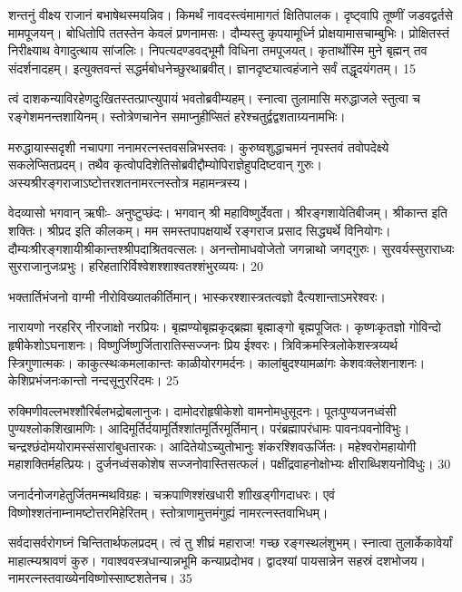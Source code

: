   शन्तनुं वीक्ष्य राजानं बभाषेथस्मयन्निव।
 किमर्थं नावदस्त्वंमामागतं क्षितिपालक।
 दृष्ट्वापि तूष्णीं जडवद्वर्तसे मामपूजयन्।
 बोधितोपि ततस्तेन केवलं प्रणनामसः।
 दौम्यस्तु कृपयामूर्ध्नि प्रोक्षयामासचाम्बुभिः।
 प्रोक्षितस्तं निरीक्ष्याथ वेगादुत्थाय सांजलिः।
 निपत्यदण्डवद्भूमौ विधिना तमपूजयत्।
 कृतार्थोस्मि मुने बृह्मन् तव संदर्शनादहम्।
 इत्युक्तवन्तं सद्धर्मबोधनेच्छुरथाब्रवीत्।
 ज्ञानदृष्ट्यात्वहंजाने सर्वं तद्धृदयंगतम्।
 15

  त्वं दाशकन्याविरहेणदुःखितस्तत्प्राप्त्युपायं भवतोब्रवीम्यहम्।
 स्नात्वा तुलामासि मरुद्धाजले स्तुत्वा च रङ्गेशमनन्तशायिनम्।
 स्तोत्रेणचानेन समाप्नुहीप्सितं हरेश्चतुर्द्वद्वशताग्र्यनामभिः।
 
मरुद्धायास्सदृशी नचापगा ननामरत्नस्तवसन्निभस्तवः।
 कुरुष्वशुद्धाचमनं नृपस्तवं तवोपदेक्ष्ये सकलेप्सितप्रदम्।
 तथैव कृत्वोपदिशेतिसोब्रवीद्दौम्योपिराज्ञेहुपदिष्टवान्
गुरुः।
 अस्यश्रीरङ्गराजाऽष्टोत्तरशतनामरत्नस्तोत्र
महामन्त्रस्य।

वेदव्यासो भगवान् ऋषीः- अनुष्टुप्छंदः।
 भगवान् श्री महाविष्णुर्देवता।
 श्रीरङ्गशायेतिबीजम्।
 श्रीकान्त इति शक्तिः।
 श्रीप्रद इति कीलकम्।
 मम समस्तपापक्षयार्थे रङ्गराज प्रसाद सिद्ध्यर्थे विनियोगः।
 दौम्यःश्रीरङ्गशायीश्रीकान्तश्श्रीपदाश्रितवत्सलः।
 अनन्तोमाधवोजेतो जगन्नाथो जगद्गुरुः।
 सुरवर्यस्सुराराध्यः सुरराजानुजःप्रभुः।
 हरिहतारिर्विश्वेशश्शाश्वतश्शंभुरव्ययः।
 20

  भक्तार्तिभंजनो वाग्मी नीरोविख्यातकीर्तिमान्।
 भास्करश्शास्त्रतत्वज्ञो दैत्यशान्ताऽमरेश्वरः।
 
नारायणो नरहरिर् नीरजाक्षो नरप्रियः।
 बृह्मण्योबृह्मकृद्ब्रह्मा बृह्माङ्गो बृह्मपूजितः।
 कृष्णःकृतज्ञो गोविन्दो हृषीकेशोऽघनाशनः।
 विष्णुर्जिष्णुर्जितारातिस्सज्जनः प्रिय ईश्वरः।
 त्रिविक्रमस्त्रिलोकेशस्त्रय्यर्थ स्त्रिगुणात्मकः।
 काकुत्स्थःकमलाकान्तः काळीयोरगमर्दनः।
 कालांबुदश्यामळांगः केशवःक्लेशनाशनः।
 केशिप्रभंजनःकान्तो नन्दसूनुररिदमः।
 25

  रुक्मिणीवल्लभश्शौरिर्बलभद्रोबलानुजः।
 दामोदरोहृषीकेशो वामनोमधुसूदनः।
 पूतःपुण्यजनध्वंसी पुण्यश्लोकशिखामणिः।
 आदिमूर्तिर्दयामूर्तिश्शांतमूर्तिरमूर्तिमान्।
 परंब्रह्मापरंधामः पावनःपवनोविभुः।
 चन्द्रश्छंदोमयोरामस्संसारांबुधतारकः।
 आदितेयोऽच्युतोभानुः शंकरश्शिवऊर्जितः।
 महेश्वरोमहायोगी महाशक्तिर्महत्प्रियः।
 दुर्जनध्वंसकोशेष सज्जनोवास्तिसत्फलं।
 पक्षींद्रवाहनोक्षोभ्यः क्षीराब्धिशयनोविधुः।
 30

  जनार्दनोजगहेतुर्जितमन्मथविग्रहः।
 चक्रपाणिश्शंखधारी शाीखड्गीगदाधरः।
 एवं विष्णोश्शतंनाम्नामष्टोत्तरमिहेरितम्।
 स्तोत्राणामुत्तमंगुह्यं नामरत्नस्तवाभिधम्।
 
सर्वदासर्वरोगघ्नं चिन्तितार्थफलप्रदम्।
 त्वं तु शीघ्रं महाराज! गच्छ रङ्गस्थलंशुभम्।
 स्नात्वा तुलार्केकावेर्यां माहात्म्यश्रावणं कुरु।
 गवाश्ववस्त्रधान्यान्नभूमि कन्याप्रदोभव।
 द्वादश्यां पायसान्नेन सहस्रं दशभोजय।
 नामरत्नस्तवाख्येनविष्णोस्साष्टशतेनच।
 35

